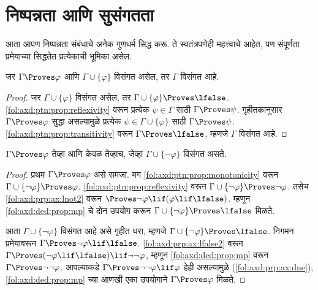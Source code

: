 \section{निष्पन्नता आणि सुसंगतता}\label{fol:axd:prv:sec}

आता आपण निष्पन्नता संबंधाचे अनेक गुणधर्म सिद्ध करू. ते स्वतंत्रपणेही
महत्त्वाचे आहेत, पण संपूर्णता प्रमेयाच्या सिद्धतेत प्रत्येकाची भूमिका असेल.

\begin{prop}\label{fol:axd:prv:prop:provability-contr}
  जर $\Gamma \Proves \varphi$ आणि $\Gamma \cup \{\varphi\}$ विसंगत असेल, तर
  $\Gamma$ विसंगत आहे.
\end{prop}

\begin{proof}
  जर $\Gamma \cup \{\varphi\}$ विसंगत असेल, तर $\Gamma \cup \{\varphi\}
  \Proves \lfalse$. \ref{fol:axd:ptn:prop:reflexivity} वरून प्रत्येक
  $\psi \in \Gamma$ साठी $\Gamma \Proves \psi$. गृहीतकानुसार
  $\Gamma \Proves \varphi$ सुद्धा असल्यामुळे प्रत्येक $\psi \in \Gamma \cup
  \{\varphi\}$ साठी $\Gamma \Proves \psi$. \ref{fol:axd:ptn:prop:transitivity}
  वरून $\Gamma \Proves \lfalse$, म्हणजे $\Gamma$ विसंगत आहे.
\end{proof}

\begin{prop}
\label{fol:axd:prv:prop:prov-incons}
$\Gamma \Proves \varphi$ तेव्हा आणि केवळ तेव्हाच, जेव्हा $\Gamma \cup \{\lnot \varphi\}$
विसंगत असते.
\end{prop}

\begin{proof}
प्रथम $\Gamma \Proves \varphi$ असे समजा. मग \ref{fol:axd:ptn:prop:monotonicity}
वरून $\Gamma \cup \{\lnot \varphi\} \Proves \varphi$. \ref{fol:axd:ptn:prop:reflexivity}
वरून $\Gamma \cup \{\lnot \varphi\} \Proves \lnot \varphi$. तसेच
\ref{fol:axd:prp:ax:lnot2} वरून $\Proves \lnot \varphi \lif (\varphi \lif \lfalse)$.
म्हणून \ref{fol:axd:ded:prop:mp} चे दोन उपयोग करून $\Gamma \cup \{\lnot
\varphi\} \Proves \lfalse$ मिळते.

आता $\Gamma \cup \{\lnot \varphi\}$ विसंगत आहे असे गृहीत धरा, म्हणजे
$\Gamma \cup \{\lnot \varphi\} \Proves \lfalse$. निगमन प्रमेयावरून $\Gamma
\Proves \lnot \varphi \lif \lfalse$. \ref{fol:axd:prp:ax:lfalse2} वरून $\Gamma
\Proves (\lnot \varphi \lif \lfalse) \lif \lnot\lnot \varphi$, म्हणून
\ref{fol:axd:ded:prop:mp} वरून $\Gamma \Proves \lnot\lnot \varphi$. आपल्याकडे
$\Gamma \Proves \lnot\lnot \varphi \lif \varphi$ हेही असल्यामुळे
(\ref{fol:axd:prp:ax:dne}), \ref{fol:axd:ded:prop:mp} च्या आणखी एका उपयोगाने
$\Gamma \Proves \varphi$ मिळते.
\end{proof}

